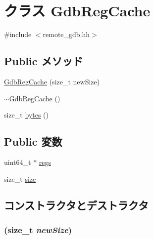 \hypertarget{classBaseRemoteGDB_1_1GdbRegCache}{
\section{クラス GdbRegCache}
\label{classBaseRemoteGDB_1_1GdbRegCache}
}


{\ttfamily \#include $<$remote\_\-gdb.hh$>$}\subsection*{Public メソッド}
\begin{DoxyCompactItemize}
\item 
\hyperlink{classBaseRemoteGDB_1_1GdbRegCache_a72ae38d6e98205849d615fb264039628}{GdbRegCache} (size\_\-t newSize)
\item 
\hyperlink{classBaseRemoteGDB_1_1GdbRegCache_a62fbac449c276f439b75391b0068fd77}{$\sim$GdbRegCache} ()
\item 
size\_\-t \hyperlink{classBaseRemoteGDB_1_1GdbRegCache_af5dc21741defa890c1d21c1071c7ea72}{bytes} ()
\end{DoxyCompactItemize}
\subsection*{Public 変数}
\begin{DoxyCompactItemize}
\item 
uint64\_\-t $\ast$ \hyperlink{classBaseRemoteGDB_1_1GdbRegCache_ac02cb30bb70aba580a68cd1e4f0df7ad}{regs}
\item 
size\_\-t \hyperlink{classBaseRemoteGDB_1_1GdbRegCache_a854352f53b148adc24983a58a1866d66}{size}
\end{DoxyCompactItemize}


\subsection{コンストラクタとデストラクタ}
\hypertarget{classBaseRemoteGDB_1_1GdbRegCache_a72ae38d6e98205849d615fb264039628}{
\subsubsection[{GdbRegCache}]{ (size\_\-t {\em newSize})}}
\label{classBaseRemoteGDB_1_1GdbRegCache_a72ae38d6e98205849d615fb264039628}



